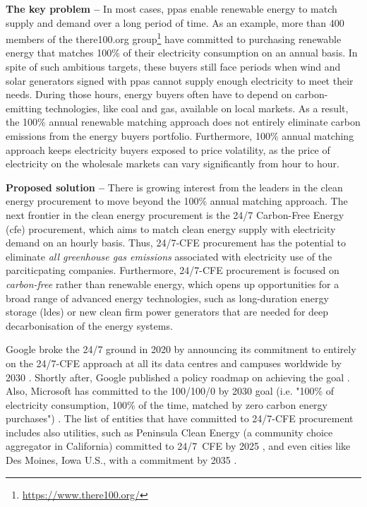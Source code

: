 \textbf{The key problem --} In most cases, \gls{ppa}s enable renewable energy to match supply and demand over a long period of time.
As an example, more than 400 members of the there100.org group\footnote{\url{https://www.there100.org/}} have committed to purchasing renewable energy that matches 100\% of their electricity consumption on an annual basis.
In spite of such ambitious targets, these buyers still face periods when wind and solar generators signed with \gls{ppa}s cannot supply enough electricity to meet their needs.
During those hours, energy buyers often have to depend on carbon-emitting technologies, like coal and gas, available on local markets.
As a result, the 100\% annual renewable matching approach does not entirely eliminate carbon emissions from the energy buyers portfolio.
Furthermore, 100\% annual matching approach keeps electricity buyers exposed to price volatility, as the price of electricity on the wholesale markets can vary significantly from hour to hour.


\textbf{Proposed solution --} There is growing interest from the leaders in the clean energy procurement to move beyond the 100\% annual matching approach.
The next frontier in the clean energy procurement is the 24/7 Carbon-Free Energy (\gls{cfe}) procurement, which aims to match clean energy supply with electricity demand on an hourly basis.
Thus, 24/7-CFE procurement has the potential to eliminate \textit{all greenhouse gas emissions} associated with electricity use of the parciticpating companies.
Furthermore, 24/7-CFE procurement is focused on \textit{carbon-free} rather than renewable energy, which opens up opportunities for a broad range of advanced energy technologies, such as long-duration energy storage (\gls{ldes}) or new clean firm power generators that are needed for deep decarbonisation of the energy systems.

Google broke the 24/7 ground in 2020 by announcing its commitment to entirely on the 24/7-CFE approach at all its data centres and campuses worldwide by 2030 \cite{google-247by2030}.
Shortly after, Google published a policy roadmap on achieving the goal \cite{google-PolicyRoadmap}.
Also, Microsoft has committed to the 100/100/0 by 2030 goal (i.e. "100\% of electricity consumption, 100\% of the time, matched by zero carbon energy purchases") \cite{Microsoft-vision}. 
The list of entities that have committed to 24/7-CFE procurement includes also utilities, such as Peninsula Clean Energy (a community choice aggregator in California) committed to 24/7~CFE by 2025 \cite{peninsula-OurPathto247}, and even cities like Des Moines, Iowa U.S., with a commitment by 2035 \cite{iowaenvcouncil-247}.

